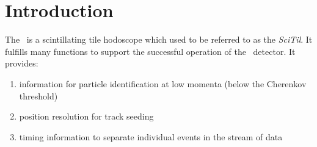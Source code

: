 \documentclass[../BTOF_summary.tex]{subfiles}
\begin{document}
\section{Introduction}

The \btofD\ is a scintillating tile hodoscope which used to be referred to as the \emph{SciTil}. It fulfills many functions to support the successful operation of the \panda\ detector. It provides:
\begin{enumerate}[I]
	\item	information for particle identification at low momenta (below the Cherenkov threshold)
	\item	position resolution for track seeding
	\item	timing information to separate individual events in the stream of data
\end{enumerate}
\end{document}
